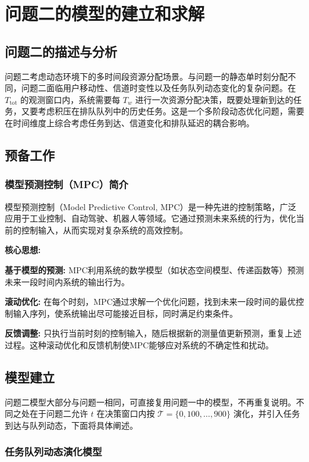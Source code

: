 \section{问题二的模型的建立和求解}
\subsection{问题二的描述与分析}

问题二考虑动态环境下的多时间段资源分配场景。与问题一的静态单时刻分配不同，问题二面临用户移动性、信道时变性以及任务队列动态变化的复杂问题。在 $T_{\mathrm{tot}}$ 的观测窗口内，系统需要每 $T_w$ 进行一次资源分配决策，既要处理新到达的任务，又要考虑积压在排队队列中的历史任务。这是一个多阶段动态优化问题，需要在时间维度上综合考虑任务到达、信道变化和排队延迟的耦合影响。

\subsection{预备工作}

\subsubsection{模型预测控制（MPC）简介}

模型预测控制（Model Predictive Control, MPC）是一种先进的控制策略，广泛应用于工业控制、自动驾驶、机器人等领域。它通过预测未来系统的行为，优化当前的控制输入，从而实现对复杂系统的高效控制。

\textbf{核心思想:}

\textbf{基于模型的预测:}
MPC利用系统的数学模型（如状态空间模型、传递函数等）预测未来一段时间内系统的输出行为。

\textbf{滚动优化:}
在每个时刻，MPC通过求解一个优化问题，找到未来一段时间的最优控制输入序列，使系统输出尽可能接近目标，同时满足约束条件。

\textbf{反馈调整:}
只执行当前时刻的控制输入，随后根据新的测量值更新预测，重复上述过程。这种滚动优化和反馈机制使MPC能够应对系统的不确定性和扰动。
\subsection{模型建立}

问题二模型大部分与问题一相同，可直接复用问题一中的模型，不再重复说明。不同之处在于问题二允许 $t$ 在决策窗口内按 $\mathcal{T}=\{0,100,\dots,900\}$ 演化，并引入任务到达与队列动态，下面将具体阐述。
\subsubsection{任务队列动态演化模型}

